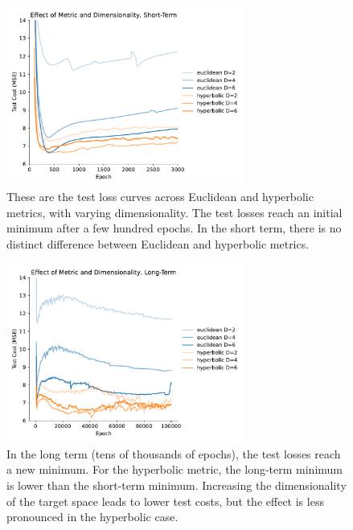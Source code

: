 \documentclass{article}
\begin{document}
\begin{figure}[H]
  \centering
  \includegraphics[width=0.7\textwidth]{figures/metric_and_dimensionality_short_term.pdf}
  \caption{These are the test loss curves across Euclidean and hyperbolic metrics, with varying dimensionality. The test losses reach an initial minimum after a few hundred epochs. In the short term, there is no distinct difference between Euclidean and hyperbolic metrics.}
  \label{fig:metric-and-dimensionality-short-term}
\end{figure}

\begin{figure}[H]
  \centering
  \includegraphics[width=0.7\textwidth]{figures/metric_and_dimensionality_long_term.pdf}
  \caption{In the long term (tens of thousands of epochs), the test losses reach a new minimum. For the hyperbolic metric, the long-term minimum is lower than the short-term minimum. Increasing the dimensionality of the target space leads to lower test costs, but the effect is less pronounced in the hyperbolic case.}
  \label{fig:metric-and-dimensionality-long-term}
\end{figure}
\end{document}
